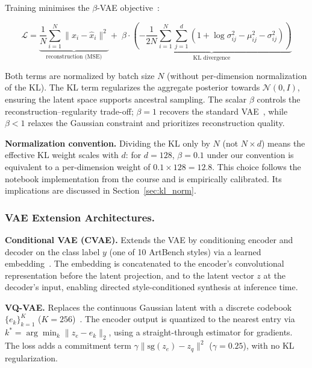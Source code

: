\documentclass[runningheads]{llncs}
\begin{document}
Training minimises the $\beta$-VAE objective~\cite{higgins2017}:

\begin{equation}
\mathcal{L} = \underbrace{\frac{1}{N}\sum_{i=1}^{N} \|x_i - \hat{x}_i\|^2}_{\text{reconstruction (MSE)}}
+ \;\beta \cdot \underbrace{\left(-\frac{1}{2N}\sum_{i=1}^{N}\sum_{j=1}^{d}\!\left(1 + \log\sigma_{ij}^2 - \mu_{ij}^2 - \sigma_{ij}^2\right)\right)}_{\text{KL divergence}}
\label{eq:bvae}
\end{equation}

Both terms are normalized by batch size $N$ (without per-dimension normalization of the KL). The KL term regularizes the aggregate posterior towards $\mathcal{N}(0,I)$, ensuring the latent space supports ancestral sampling. The scalar $\beta$ controls the reconstruction–regularity trade-off; $\beta=1$ recovers the standard VAE~\cite{kingma2013}, while $\beta<1$ relaxes the Gaussian constraint and prioritizes reconstruction quality.

\noindent\textbf{Normalization convention.} Dividing the KL only by $N$ (not $N \times d$) means the effective KL weight scales with $d$: for $d=128$, $\beta=0.1$ under our convention is equivalent to a per-dimension weight of $0.1 \times 128 = 12.8$. This choice follows the notebook implementation from the course and is empirically calibrated. Its implications are discussed in Section~\ref{sec:kl_norm}.

\subsubsection{VAE Extension Architectures.}

\noindent\textbf{Conditional VAE (CVAE).} Extends the VAE by conditioning encoder and decoder on the class label $y$ (one of 10 ArtBench styles) via a learned embedding~\cite{sohn2015}. The embedding is concatenated to the encoder's convolutional representation before the latent projection, and to the latent vector $z$ at the decoder's input, enabling directed style-conditioned synthesis at inference time.

\noindent\textbf{VQ-VAE.} Replaces the continuous Gaussian latent with a discrete codebook $\{e_k\}_{k=1}^{K}$ ($K=256$)~\cite{oord2017}. The encoder output is quantized to the nearest entry via $k^* = \arg\min_k \|z_e - e_k\|_2$, using a straight-through estimator for gradients. The loss adds a commitment term $\gamma\|\mathrm{sg}(z_e) - z_q\|^2$ ($\gamma=0.25$), with no KL regularization.
\end{document}
